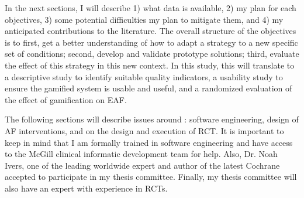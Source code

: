 In the next sections, I will describe 1) what data is available, 2) my plan for each objectives, 3) some potential difficulties my plan to mitigate them, and 4) my anticipated contributions to the literature. The overall structure of the objectives is to first, get a better understanding of how to adapt a strategy to a new specific set of conditions; second, develop and validate prototype solutions; third, evaluate the effect of this strategy in this new context. In this study, this will translate to a descriptive study to identify suitable quality indicators, a usability study to ensure the gamified system is usable and useful, and a randomized evaluation of the effect of gamification on \gls{EAF}.

The following sections will describe issues around : software engineering, design of \gls{AF} interventions, and on the design and execution of RCT. It is important to keep in mind that I am formally trained in software engineering and have access to the McGill clinical informatic development team for help. Also, Dr. Noah Ivers, one of the leading worldwide expert and author of the latest Cochrane accepted to participate in my thesis committee. Finally, my thesis committee will also have an expert with experience in RCTs.